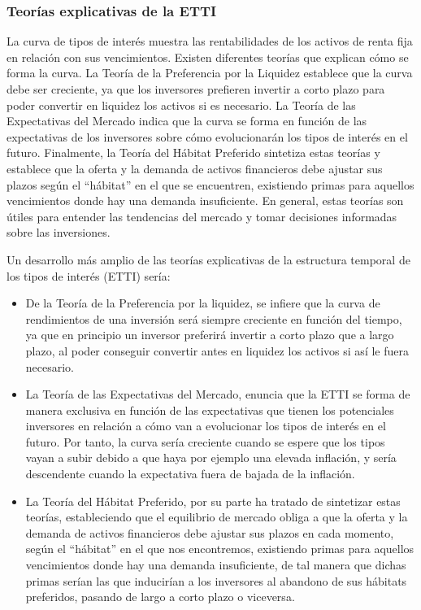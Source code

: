 \documentclass[
  letterpaper,
  DIV=11,
  numbers=noendperiod]{scrreprt}
\begin{document}
\begin{tcolorbox}
\subsubsection{Teorías explicativas de la
ETTI}\label{teoruxedas-explicativas-de-la-etti}

La curva de tipos de interés muestra las rentabilidades de los activos
de renta fija en relación con sus vencimientos. Existen diferentes
teorías que explican cómo se forma la curva. La Teoría de la Preferencia
por la Liquidez establece que la curva debe ser creciente, ya que los
inversores prefieren invertir a corto plazo para poder convertir en
liquidez los activos si es necesario. La Teoría de las Expectativas del
Mercado indica que la curva se forma en función de las expectativas de
los inversores sobre cómo evolucionarán los tipos de interés en el
futuro. Finalmente, la Teoría del Hábitat Preferido sintetiza estas
teorías y establece que la oferta y la demanda de activos financieros
debe ajustar sus plazos según el ``hábitat'' en el que se encuentren,
existiendo primas para aquellos vencimientos donde hay una demanda
insuficiente. En general, estas teorías son útiles para entender las
tendencias del mercado y tomar decisiones informadas sobre las
inversiones.

Un desarrollo más amplio de las teorías explicativas de la estructura
temporal de los tipos de interés (ETTI) sería:

\begin{itemize}
\item
  De la Teoría de la Preferencia por la liquidez, se infiere que la
  curva de rendimientos de una inversión será siempre creciente en
  función del tiempo, ya que en principio un inversor preferirá invertir
  a corto plazo que a largo plazo, al poder conseguir convertir antes en
  liquidez los activos si así le fuera necesario.
\item
  La Teoría de las Expectativas del Mercado, enuncia que la ETTI se
  forma de manera exclusiva en función de las expectativas que tienen
  los potenciales inversores en relación a cómo van a evolucionar los
  tipos de interés en el futuro. Por tanto, la curva sería creciente
  cuando se espere que los tipos vayan a subir debido a que haya por
  ejemplo una elevada inflación, y sería descendente cuando la
  expectativa fuera de bajada de la inflación.
\item
  La Teoría del Hábitat Preferido, por su parte ha tratado de sintetizar
  estas teorías, estableciendo que el equilibrio de mercado obliga a que
  la oferta y la demanda de activos financieros debe ajustar sus plazos
  en cada momento, según el ``hábitat'' en el que nos encontremos,
  existiendo primas para aquellos vencimientos donde hay una demanda
  insuficiente, de tal manera que dichas primas serían las que
  inducirían a los inversores al abandono de sus hábitats preferidos,
  pasando de largo a corto plazo o viceversa.
\end{itemize}


\end{tcolorbox}
\end{document}
